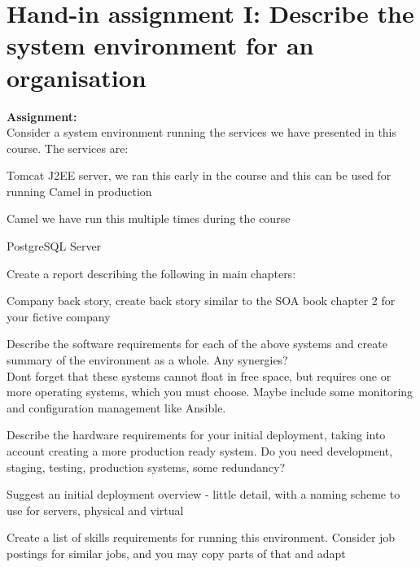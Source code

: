 \documentclass[a4paper,11pt,notitlepage]{report}
\begin{document}
\rm
{}

\newcommand{\course}[1]{KEA System Integration\\ exercises}




\setcounter{tocdepth}{0}

\normal



\chapter*{Hand-in assignment I: Describe the system environment for an organisation}

{\bf Assignment:}\\
Consider a system environment running the services we have presented in this course. The services are:

\begin{list2}
\item Tomcat J2EE server, we ran this early in the course and this can be used for running Camel in production
\item Camel we have run this multiple times during the course
\item PostgreSQL Server
\end{list2}

Create a report describing the following in main chapters:

\begin{list2}
\item Company back story, create back story similar to the SOA book chapter 2 for your fictive company
\item Describe the software requirements for each of the above systems and create summary of the environment as a whole. Any synergies?\\
Dont forget that these systems cannot float in free space, but requires one or more operating systems, which you must choose. Maybe include some monitoring and configuration management like Ansible.
\item Describe the hardware requirements for your initial deployment, taking into account creating a more production ready system. Do you need development, staging, testing, production systems, some redundancy?
\item Suggest an initial deployment overview - little detail, with a naming scheme to use for servers, physical and virtual
\item Create a list of skills requirements for running this environment. Consider job postings for similar jobs, and you may copy parts of that and adapt
\end{list2}
\end{document}
